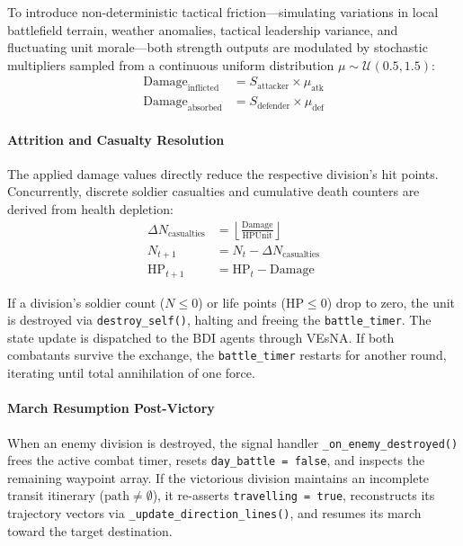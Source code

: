 To introduce non-deterministic tactical friction—simulating variations in local battlefield terrain, weather anomalies, tactical leadership variance, and fluctuating unit morale—both strength outputs are modulated by stochastic multipliers sampled from a continuous uniform distribution $\mu \sim \mathcal{U}(0.5, 1.5)$:
\begin{align}
    \text{Damage}_{\text{inflicted}} &= S_{\text{attacker}} \times \mu_{\text{atk}} \\
    \text{Damage}_{\text{absorbed}} &= S_{\text{defender}} \times \mu_{\text{def}}
\end{align}

\paragraph{Attrition and Casualty Resolution}
The applied damage values directly reduce the respective division's hit points. Concurrently, discrete soldier casualties and cumulative death counters are derived from health depletion:
\begin{align}
    \Delta N_{\text{casualties}} &= \left\lfloor \frac{\text{Damage}}{\text{HPUnit}} \right\rfloor \\
    N_{t+1} &= N_t - \Delta N_{\text{casualties}} \\
    \text{HP}_{t+1} &= \text{HP}_t - \text{Damage}
\end{align}

If a division's soldier count ($N \le 0$) or life points ($\text{HP} \le 0$) drop to zero, the unit is destroyed via \texttt{destroy\_self()}, halting and freeing the \texttt{battle\_timer}. The state update is dispatched to the BDI agents through VEsNA. If both combatants survive the exchange, the \texttt{battle\_timer} restarts for another round, iterating until total annihilation of one force.

\paragraph{March Resumption Post-Victory}
When an enemy division is destroyed, the signal handler \texttt{\_on\_enemy\_destroyed()} frees the active combat timer, resets \texttt{day\_battle = false}, and inspects the remaining waypoint array. If the victorious division maintains an incomplete transit itinerary ($\text{path} \neq \emptyset$), it re-asserts \texttt{travelling = true}, reconstructs its trajectory vectors via \texttt{\_update\_direction\_lines()}, and resumes its march toward the target destination.

